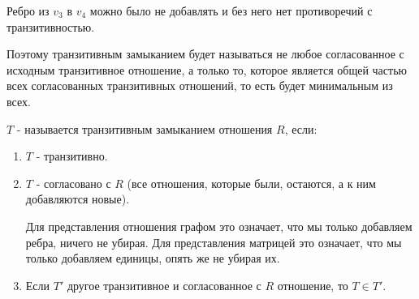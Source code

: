 \documentclass[russian]{lecture-notes}
\begin{document}
Ребро из $v_3$ в $v_4$ можно было не добавлять и без него нет противоречий с транзитивностью.

\begin{figure}[H]
    \centering
\end{figure}


Поэтому транзитивным замыканием будет называться не любое согласованное с исходным транзитивное отношение, а только то, которое является общей частью всех согласованных транзитивных отношений, то есть будет минимальным из всех.


\begin{definition}
    $T$ - называется транзитивным замыканием отношения $R$, если:
    \begin{enumerate}
    \item $T$ - транзитивно.
    \item $T$ - согласовано с $R$ (все отношения, которые были, остаются, а к ним добавляются новые).
    \begin{note}
        Для представления отношения графом это означает, что мы только добавляем ребра, ничего не убирая. Для представления матрицей это означает, что мы только добавляем единицы, опять же не убирая их.
    \end{note}
    \item Если $T'$ другое транзитивное и согласованное с $R$ отношение, то $T \in T'$.
    \end{enumerate} 
\end{definition}
\end{document}
